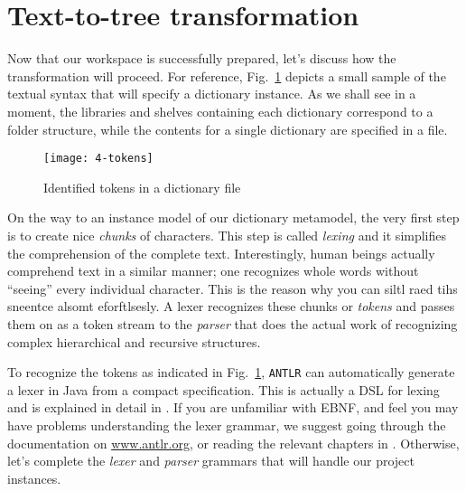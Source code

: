 \newpage
\section{Text-to-tree transformation}
\genHeader

Now that our workspace is successfully prepared, let's discuss how the transformation will proceed. For reference, Fig.~\ref{fig:moca-4-Tokens} depicts a small
sample of the textual syntax that will specify a dictionary instance. As we shall see in a moment, the libraries and shelves containing each dictionary correspond to a folder structure, while the
contents for a single dictionary are specified in a file.

\begin{figure}[!htbp]
\begin{center}
 \texttt{[image: 4-tokens]}
  \caption{Identified tokens in a dictionary file}
  \label{fig:moca-4-Tokens}
\end{center}
\end{figure}

On the way to an instance model of our dictionary metamodel, the very first step is to create nice \emph{chunks} of characters. This step is called
\emph{lexing} and it simplifies the comprehension of the complete text. Interestingly, human beings actually comprehend text in a similar manner; one
recognizes whole words without ``seeing'' every individual character. This is the reason why you can siltl raed tihs sneentce alsomt eforftlsesly. A lexer
recognizes these chunks or \emph{tokens} and passes them on as a token stream to the \emph{parser} that does the actual work of recognizing complex
hierarchical and recursive structures.
   
To recognize the tokens as indicated in Fig.~\ref{fig:moca-4-Tokens}, \texttt{ANTLR} can automatically generate a lexer in Java from a compact specification.
This is actually a DSL for lexing and is explained in detail in \cite{ANTLR}. If you are unfamiliar with EBNF, and feel you may have problems understanding
the lexer grammar, we suggest going through the documentation on \url{www.antlr.org}, or reading the relevant chapters in \cite{ANTLR}. Otherwise, let's
complete the \emph{lexer} and \emph{parser} grammars that will handle our project instances.


